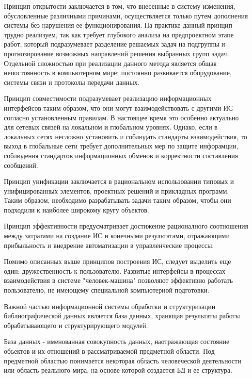 Принцип открытости заключается в том, что внесенные в систему изменения, обусловленные различными причинами, осуществляется только путем дополнения системы без нарушения ее функционирования. На практике данный принцип трудно реализуем, так как требует глубокого анализа на предпроектном этапе работ, который подразумевает разделение решаемых задач на подгруппы и прогнозирование возможных направлений решения выбранных групп задач. Отдельной сложностью при реализации данного метода является общая непостоянность в компьютерном мире: постоянно развивается оборудование, системы связи и протоколы передачи данных.

Принцип совместимости подразумевает реализацию информационных интерфейсов таким образом, что они могут взаимодействовать с другими ИС согласно установленным правилам. В настоящее время это особенно актуально для сетевых связей на локальном и глобальном уровнях. Однако, если в локальных сетях несложно установить и соблюдать стандарты взаимодействия, то выход в глобальные сети требует дополнительных мер по защите инфорамции, соблюдения стандартов информационных обменов и корректности составления сообщений.

Принцип унификации заключается в рациональном использовании типовых и унифицированных элементов, проектных решений и прикладных программ. Таким образом, необходимо разрабатывать задачи таким образом, чтобы они подходили к наиболее широкому кругу объектов. 

Принцип эффективности предусматривает достижение рационалного соотношения между затратами на создание ИС и конечными результатами, отражающими прибыльность и внедрение автоматизации в управленческие процессы.

Помимо описанных выше принципов построения ИС, следует выделить еще один: дружественность к пользователю. Развитые интерфейсы в процессах взаимодействия в системе "человек-машина" позволяют эффективно работать пользователю, не имеющему специальной компьютерной подготовки.

Важной частью информационной системы обработки и структуризации библиографической данных является база данных, хранящая результаты работы обрабатывающего и структурирующего модулей.

База данных - именованная совокупность данных, наотражающая состояние объектов и их отношений в рассматриваемой предметной области. Под предметной областью понимается некоторая область человеческой деятельности или область реального мира, на основе которой создается БД и ее структура.

